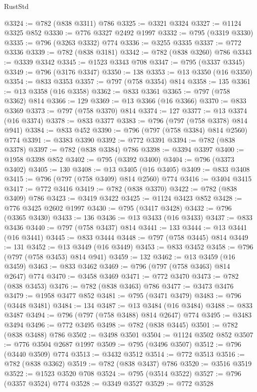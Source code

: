 \begin{lexlean}{RustStd}
\begin{coremodule}
{\begin{coremodule}
{{{{{{{{{{{{{{@3324 := @782 (@838 @3311) @786
@3325 := @3321 @3324
@3327 := @1124 @3325 @852
@3330 := @776 @3327 @2492 @1997
@3332 := @795 (@3319 @3330)
@3335 := @796 (@3263 @3332) @774
@3336 := @3255 @3335
@3337 := @772 @3336
@3339 := @782 (@838 @3181)
@3342 := @782 (@838 @3260) @786
@3343 := @3339 @3342
@3345 := @1523 @3343 @708
@3347 := @795 (@3337 @3345)
@3349 := @796 (@3176 @3347)
@3350 := 138
@3353 := @13 @3350 (@16 @3350)
@3354 := @833 @3353
@3357 := @797 (@758 @3354) @814
@3358 := 135
@3361 := @13 @3358 (@16 @3358)
@3362 := @833 @3361
@3365 := @797 (@758 @3362) @814
@3366 := 129
@3369 := @13 @3366 (@16 @3366)
@3370 := @833 @3369
@3373 := @797 (@758 @3370) @814
@3374 := 127
@3377 := @13 @3374 (@16 @3374)
@3378 := @833 @3377
@3383 := @796 (@797 (@758 @3378) @814 @941)
@3384 := @833 @452
@3390 := @796 (@797 (@758 @3384) @814 @2560) @774
@3391 := @3383 @3390
@3392 := @772 @3391
@3394 := @782 (@838 @3378)
@3397 := @782 (@838 @3384) @786
@3398 := @3394 @3397
@3400 := @1958 @3398 @852
@3402 := @795 (@3392 @3400)
@3404 := @796 (@3373 @3402)
@3405 := 130
@3408 := @13 @3405 (@16 @3405)
@3409 := @833 @3408
@3415 := @796 (@797 (@758 @3409) @814 @2560) @774
@3416 := @3404 @3415
@3417 := @772 @3416
@3419 := @782 (@838 @3370)
@3422 := @782 (@838 @3409) @786
@3423 := @3419 @3422
@3425 := @1124 @3423 @852
@3428 := @776 @3425 @2602 @1997
@3430 := @795 (@3417 @3428)
@3432 := @796 (@3365 @3430)
@3433 := 136
@3436 := @13 @3433 (@16 @3433)
@3437 := @833 @3436
@3440 := @797 (@758 @3437) @814
@3441 := 133
@3444 := @13 @3441 (@16 @3441)
@3445 := @833 @3444
@3448 := @797 (@758 @3445) @814
@3449 := 131
@3452 := @13 @3449 (@16 @3449)
@3453 := @833 @3452
@3458 := @796 (@797 (@758 @3453) @814 @941)
@3459 := 132
@3462 := @13 @3459 (@16 @3459)
@3463 := @833 @3462
@3469 := @796 (@797 (@758 @3463) @814 @2647) @774
@3470 := @3458 @3469
@3471 := @772 @3470
@3473 := @782 (@838 @3453)
@3476 := @782 (@838 @3463) @786
@3477 := @3473 @3476
@3479 := @1958 @3477 @852
@3481 := @795 (@3471 @3479)
@3483 := @796 (@3448 @3481)
@3484 := 134
@3487 := @13 @3484 (@16 @3484)
@3488 := @833 @3487
@3494 := @796 (@797 (@758 @3488) @814 @2647) @774
@3495 := @3483 @3494
@3496 := @772 @3495
@3498 := @782 (@838 @3445)
@3501 := @782 (@838 @3488) @786
@3502 := @3498 @3501
@3504 := @1124 @3502 @852
@3507 := @776 @3504 @2687 @1997
@3509 := @795 (@3496 @3507)
@3512 := @796 (@3440 @3509) @774
@3513 := @3432 @3512
@3514 := @772 @3513
@3516 := @782 (@838 @3362)
@3519 := @782 (@838 @3437) @786
@3520 := @3516 @3519
@3522 := @1523 @3520 @708
@3524 := @795 (@3514 @3522)
@3527 := @796 (@3357 @3524) @774
@3528 := @3349 @3527
@3529 := @772 @3528
}}}}}}}}}}}}}}
\end{coremodule}}
\end{coremodule}
\end{lexlean}
